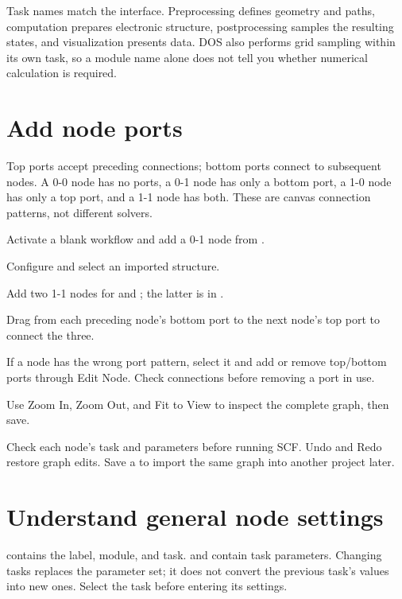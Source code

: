 Task names match the interface. Preprocessing defines geometry and paths, computation prepares electronic structure, postprocessing samples the resulting states, and visualization presents data. DOS also performs grid sampling within its own task, so a module name alone does not tell you whether numerical calculation is required.

\section{Add node ports}

Top ports accept preceding connections; bottom ports connect to subsequent nodes. A 0-0 node has no ports, a 0-1 node has only a bottom port, a 1-0 node has only a top port, and a 1-1 node has both. These are canvas connection patterns, not different solvers.

\begin{steps}
\item Activate a blank workflow and add a 0-1 node from .
\item Configure  and select an imported structure.
\item Add two 1-1 nodes for  and ; the latter is in .
\item Drag from each preceding node's bottom port to the next node's top port to connect the three.
\item If a node has the wrong port pattern, select it and add or remove top/bottom ports through Edit Node. Check connections before removing a port in use.
\item Use Zoom In, Zoom Out, and Fit to View to inspect the complete graph, then save.
\end{steps}

Check each node's task and parameters before running SCF. Undo and Redo restore graph edits. Save a  to import the same graph into another project later.

\section{Understand general node settings}

 contains the label, module, and task.  and  contain task parameters. Changing tasks replaces the parameter set; it does not convert the previous task's values into new ones. Select the task before entering its settings.

